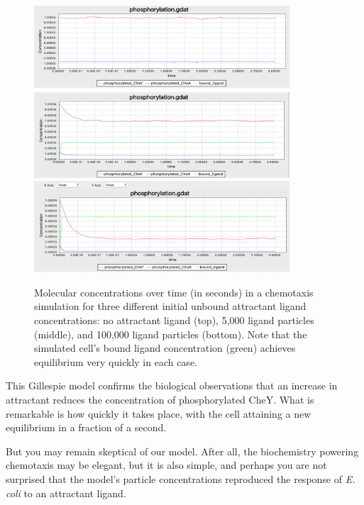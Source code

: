 \begin{figure}[h]
\centering
\mySfFamily
\includegraphics[width = 0.85\textwidth]{../images/chemotaxis_tutorial5.png}\\[2ex]
\includegraphics[width = 0.85\textwidth]{../images/chemotaxis_tutorial6.png}\\[2ex]
\includegraphics[width = 0.85\textwidth]{../images/chemotaxis_tutorial7.png}
\caption{Molecular concentrations over time (in seconds) in a chemotaxis simulation for three different initial unbound attractant ligand concentrations: no attractant ligand (top), 5,000 ligand particles (middle), and 100,000 ligand particles (bottom). Note that the simulated cell's bound ligand concentration (green) achieves equilibrium very quickly in each case.}
\label{fig:chemotaxis_concentrations}
\end{figure}

This Gillespie model confirms the biological observations that an increase in attractant reduces the concentration of phosphorylated CheY. What is remarkable is how quickly it takes place, with the cell attaining a new equilibrium in a fraction of a second.

But you may remain skeptical of our model. After all, the biochemistry powering chemotaxis may be elegant, but it is also simple, and perhaps you are not surprised that the model's particle concentrations reproduced the response of \textit{E. coli} to an attractant ligand.

